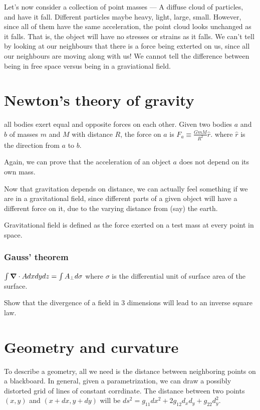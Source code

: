 \documentclass[11pt]{book}
\begin{document}
Let's now consider a collection of point masses --- A diffuse cloud of
particles, and have it fall. Different particles maybe heavy, light, large,
small. However, since all of them have the same acceleration, the point cloud
looks unchanged as it falls. That is, the object will have no stresses or
strains as it falls. We can't tell by looking at our neighbours that there is a
force being exterted on us, since all our neighbours are moving along with us!
We cannot tell the difference between being in free space versus being in a
graviational field.

\section{Newton's theory of gravity}
all bodies exert equal and opposite forces on each other. Given two bodies $a$
and $b$ of masses $m$ and $M$ with distance $R$, the force on $a$ is
${F_a \equiv \frac{GmM}{R^2}} \hat{r}$. where $\hat r$ is the direction from $a$
to $b$.

Again, we can prove that the acceleration of an object $a$ does not depend on
its own mass.

Now that gravitation depends on distance, we can actually feel something if we
are in a gravitational field, since different parts of a given object will have
a different force on it, due to the varying distance from (say) the earth.

Gravitational field is defined as the force exerted on a test mass at every
point in space.

\subsubsection{Gauss' theorem}
${\int  \grad \cdot A dx dy dz  = \int A_{\bot} d\sigma}$ where $\sigma$ is the
differential unit of surface area of the surface. 

Show that the divergence of a field in 3 dimensions will lead to an inverse
square law.


\section{Geometry and curvature}

To describe a geometry, all we need is the distance between neighboring points
on a blackboard. In general, given a parametrization, we can draw a possibly
distorted grid of lines of constant corrdinate. The distance between two points
${(x, y)}$ and ${(x + dx, y+ dy)}$ will be ${ds^2 = g_{11} dx^2 + 2 g_{12} d_x d_y + g_{22} d_y^2}$.
\end{document}
